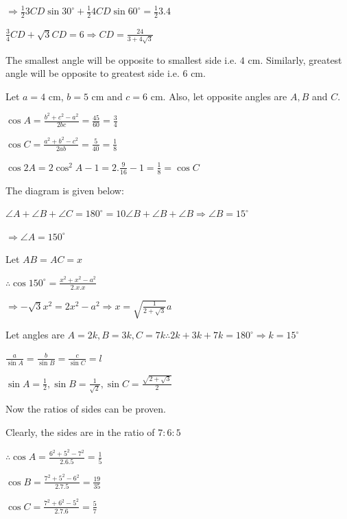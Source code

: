   $\Rightarrow \frac{1}{2}3CD\sin30^\circ + \frac{1}{2}4CD\sin60^\circ = \frac{1}{2}3.4$

  $\frac{3}{4}CD + \sqrt{3}CD = 6 \Rightarrow CD = \frac{24}{3 + 4\sqrt{3}}$
\item The smallest angle will be opposite to smallest side i.e. $4$ cm. Similarly, greatest angle will be opposite to greatest
  side i.e. $6$ cm.

  Let $a = 4$ cm, $b = 5$ cm and $c = 6$ cm. Also, let opposite angles are $A, B$ and $C.$

  $\cos A = \frac{b^2 + c^2 - a^2}{2bc} = \frac{45}{60} = \frac{3}{4}$

  $\cos C = \frac{a^2 + b^2 - c^2}{2ab} = \frac{5}{40} = \frac{1}{8}$

  $\cos 2A = 2\cos^2A - 1 = 2.\frac{9}{16} - 1 = \frac{1}{8} = \cos C$

\item The diagram is given below:

  \startplacefigure
    \externalfigure[18_3.pdf]
  \stopplacefigure

  $\angle A + \angle B + \angle C = 180^\circ = 10\angle B + \angle B + \angle B \Rightarrow \angle B = 15^\circ$

  $\Rightarrow \angle A = 150^\circ$

  Let $AB = AC = x$

  $\therefore \cos 150^\circ = \frac{x^2 + x^2 - a^2}{2.x.x}$

  $\Rightarrow -\sqrt{3}x^2 = 2x^2 - a^2 \Rightarrow x = \sqrt{\frac{1}{2 + \sqrt{3}}}a$

\item Let angles are $A = 2k, B=3k, C=7k \therefore 2k + 3k + 7k = 180^\circ \Rightarrow k = 15^\circ$

  $\frac{a}{\sin A} = \frac{b}{\sin B} = \frac{c}{\sin C} = l$

  $\sin A = \frac{1}{2}, \sin B= \frac{1}{\sqrt{2}}, \sin C = \frac{\sqrt{2 + \sqrt{3}}}{2}$

  Now the ratios of sides can be proven.

\item Clearly, the sides are in the ratio of $7:6:5$

  $\therefore \cos A = \frac{6^2 + 5^2 - 7^2}{2.6.5} = \frac{1}{5}$

  $\cos B = \frac{7^2 + 5^2 - 6^2}{2.7.5} = \frac{19}{35}$

  $\cos C = \frac{7^2 + 6^2 - 5^2}{2.7.6} = \frac{5}{7}$


